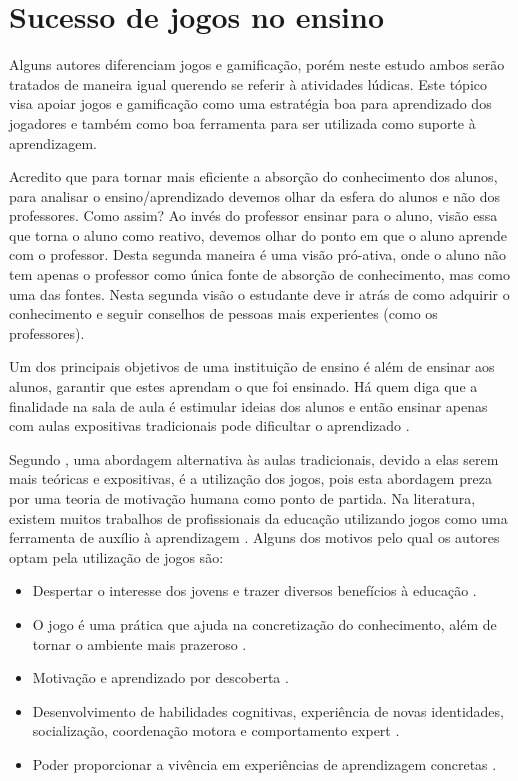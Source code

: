 
\section[Sucesso de jogos no ensino]{Sucesso de jogos no ensino}

Alguns autores diferenciam jogos e gamificação, porém neste estudo ambos serão tratados de maneira igual querendo se referir à atividades lúdicas. Este tópico visa apoiar jogos e gamificação como uma estratégia boa para aprendizado dos jogadores e também como boa ferramenta para ser utilizada como suporte à aprendizagem.  

Acredito que para tornar mais eficiente a absorção do conhecimento dos alunos, para analisar o ensino/aprendizado devemos olhar da esfera do alunos e não dos professores. Como assim? Ao invés do professor ensinar para o aluno, visão essa que torna o aluno como reativo, devemos olhar do ponto em que o aluno aprende com o professor. Desta segunda maneira é uma visão pró-ativa, onde o aluno não tem apenas o professor como única fonte de absorção de conhecimento, mas como uma das fontes. Nesta segunda visão o estudante deve ir atrás de como adquirir o conhecimento e seguir conselhos de pessoas mais experientes (como os professores). 

Um dos principais objetivos de uma instituição de ensino é além de ensinar aos alunos, garantir que estes aprendam o que foi ensinado. Há quem diga que a finalidade na sala de aula é estimular ideias dos alunos e então ensinar apenas com aulas expositivas tradicionais pode dificultar o aprendizado \cite[p. 4]{sucessoJogoEngSoft}.

Segundo , uma abordagem alternativa às aulas tradicionais, devido  a elas serem mais teóricas e expositivas, é a utilização dos jogos, pois esta abordagem preza por uma teoria de motivação humana como ponto de partida. Na literatura, existem muitos trabalhos de profissionais da educação utilizando jogos como uma ferramenta de auxílio à aprendizagem \cite[p. 3]{sucessoJogoEngSoft}. Alguns dos motivos pelo qual os autores optam pela utilização de jogos são:

\begin{itemize}
	\item Despertar o interesse dos jovens e trazer diversos benefícios à educação \cite{appcalculo}.
	\item O jogo é uma prática que ajuda na concretização do conhecimento, além de tornar o ambiente mais prazeroso \cite{jogoPratPedagoc}. 
	\item Motivação e aprendizado por descoberta .
	\item Desenvolvimento de habilidades cognitivas, experiência de novas identidades, socialização, coordenação motora e comportamento expert \cite[p. 3 e 4]{savi}.
	\item Poder proporcionar a vivência em experiências de aprendizagem concretas .
\end{itemize}

